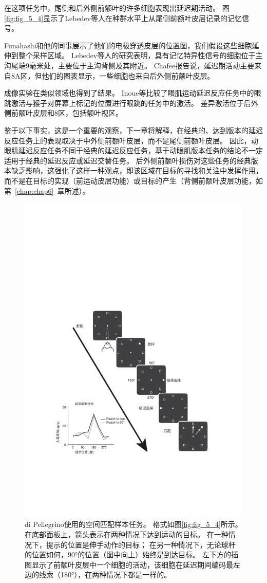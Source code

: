 在这项任务中，尾侧和后外侧前额叶的许多细胞表现出延迟期活动\cite{chafee1998matching}。
图\ref{fig:fig_5_4}显示了Lebedev等人\cite{lebedev2004representation}在种群水平上从尾侧前额叶皮层记录的记忆信号。


Funahashi和他的同事\cite{funahashi1989mnemonic,takeda2002prefrontal}展示了他们的电极穿透皮层的位置图，我们假设这些细胞延伸到整个采样区域。
Lebedev等人的研究表明，具有记忆特异性信号的细胞位于主沟尾端9毫米处，主要位于主沟背侧及其附近。
Chafee\cite{chafee1998matching}报告说，延迟期活动主要来自8A区，但他们的图表显示，一些细胞也来自后外侧前额叶皮层。


成像实验在类似领域也得到了结果。
Inoue等\cite{inoue2004functional}比较了眼肌运动延迟反应任务中的眼跳激活与猴子对屏幕上标记的位置进行眼跳的任务中的激活。
差异激活位于后外侧前额叶皮层和8区，包括额叶视区。


鉴于以下事实，这是一个重要的观察，下一章将解释，在经典的、达到版本的延迟反应任务上的表现取决于中外侧前额叶皮层，而不是尾侧前额叶皮层。
因此，动眼肌延迟反应任务不同于经典的延迟反应任务，基于动眼肌版本任务的结论不一定适用于经典的延迟反应或延迟交替任务。
后外侧前额叶损伤对这些任务的经典版本缺乏影响\cite{butters1969retention}，这强化了这样一种观点，即该区域在目标的寻找和关注中发挥作用，而不是在目标的实现（前运动皮层功能）或目标的产生（背侧前额叶皮层功能，如第~\ref{chap:chap6}~章所述）。


\begin{figure}
	\centering
	\includegraphics[width=0.7\linewidth]{image_pfc/Fig_5_5}
	\caption{di Pellegrino\cite{di1993visuospatial}使用的空间匹配样本任务。
		格式如图\ref{fig:fig_5_4}所示。
		在底部面板上，箭头表示在两种情况下达到运动的目标。
		在一种情况下，提示的位置是伸手动作的目标；
		在另一种情况下，无论球杆的位置如何，90°的位置（图中向上）始终是到达目标。
		左下方的插图显示了前额叶皮层中一个细胞的活动，该细胞在延迟期间编码最左边的线索（180°），在两种情况下都是一样的。}
	\label{fig:fig_5_5}
\end{figure}


